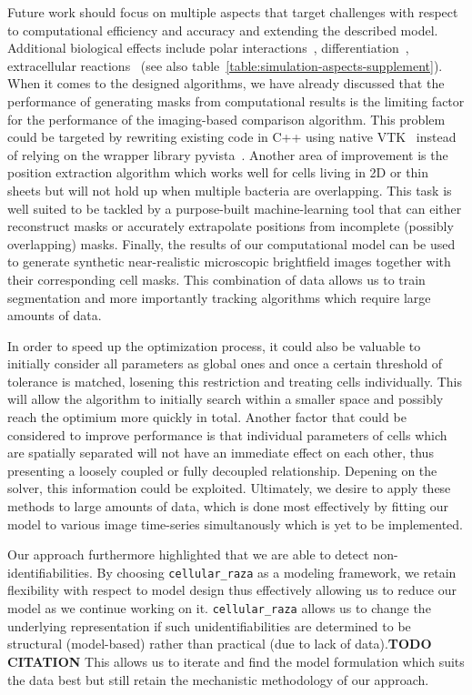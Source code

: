 \documentclass{article}
\begin{document}
Future work should focus on multiple aspects that target challenges with respect to computational
efficiency and accuracy and extending the described model.
Additional biological effects include polar interactions~\cite{Duvernoy2018},
differentiation~\cite{vanGestel2015}, extracellular reactions~\cite{Li2025} (see also
table~\ref{table:simulation-aspects-supplement}).
When it comes to the designed algorithms, we have already discussed that the performance of
generating masks from computational results is the limiting factor for the performance of the
imaging-based comparison algorithm.
This problem could be targeted by rewriting existing code in C++ using native VTK~\cite{vtkBook}
instead of relying on the wrapper library pyvista~\cite{Sullivan2019}.
Another area of improvement is the position extraction algorithm which works well for cells living
in 2D or thin sheets but will not hold up when multiple bacteria are overlapping.
This task is well suited to be tackled by a purpose-built machine-learning tool that can either
reconstruct masks or accurately extrapolate positions from incomplete (possibly overlapping) masks.
Finally, the results of our computational model can be used to generate synthetic near-realistic
microscopic brightfield images together with their corresponding cell masks.
This combination of data allows us to train segmentation and more importantly tracking algorithms
which require large amounts of data.

In order to speed up the optimization process, it could also be valuable to initially consider all
parameters as global ones and once a certain threshold of tolerance is matched, losening this
restriction and treating cells individually.
This will allow the algorithm to initially search within a smaller space and possibly reach the
optimium more quickly in total.
Another factor that could be considered to improve performance is that individual parameters of
cells which are spatially separated will not have an immediate effect on each other, thus presenting
a loosely coupled or fully decoupled relationship.
Depening on the solver, this information could be exploited.
Ultimately, we desire to apply these methods to large amounts of data, which is done most
effectively by fitting our model to various image time-series simultanously which is yet to be
implemented.

Our approach furthermore highlighted that we are able to detect non-identifiabilities.
By choosing \texttt{cellular\_raza} as a modeling framework, we retain flexibility with respect to
model design thus effectively allowing us to reduce our model as we continue working on it.
\texttt{cellular\_raza} allows us to change the underlying representation if such unidentifiabilities
are determined to be structural (model-based) rather than practical (due to lack of
data).\textbf{TODO CITATION}
This allows us to iterate and find the model formulation which suits the data best but still retain
the mechanistic methodology of our approach.
\end{document}
